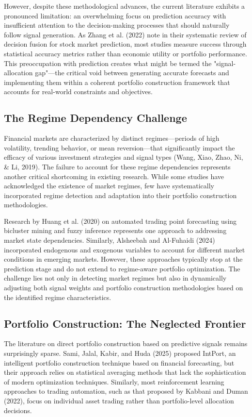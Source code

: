 \documentclass{singlecol-new}
\theoremstyle{TH}{
\newtheorem{lemma}{Lemma}
\newtheorem{theorem}[lemma]{Theorem}
\newtheorem{corrolary}[lemma]{Corrolary}
\newtheorem{conjecture}[lemma]{Conjecture}
\newtheorem{proposition}[lemma]{Proposition}
\newtheorem{claim}[lemma]{Claim}
\newtheorem{stheorem}[lemma]{Wrong Theorem}
\newtheorem{algorithm}{Algorithm}
}
\theoremstyle{THrm}{
\newtheorem{definition}{Definition}[section]
\newtheorem{question}{Question}[section]
\newtheorem{remark}{Remark}
\newtheorem{scheme}{Scheme}
}
\theoremstyle{THhit}{
\newtheorem{case}{Case}[section]
}
\begin{document}
However, despite these methodological advances, the current literature exhibits a pronounced limitation: an overwhelming focus on prediction accuracy with insufficient attention to the decision-making processes that should naturally follow signal generation. As Zhang et al. (2022) note in their systematic review of decision fusion for stock market prediction, most studies measure success through statistical accuracy metrics rather than economic utility or portfolio performance. This preoccupation with prediction creates what might be termed the "signal-allocation gap"—the critical void between generating accurate forecasts and implementing them within a coherent portfolio construction framework that accounts for real-world constraints and objectives.


\subsection{The Regime Dependency Challenge}
Financial markets are characterized by distinct regimes—periods of high volatility, trending behavior, or mean reversion—that significantly impact the efficacy of various investment strategies and signal types (Wang, Xiao, Zhao, Ni, \& Li, 2019). The failure to account for these regime dependencies represents another critical shortcoming in existing research. While some studies have acknowledged the existence of market regimes, few have systematically incorporated regime detection and adaptation into their portfolio construction methodologies.

Research by Huang et al. (2020) on automated trading point forecasting using bicluster mining and fuzzy inference represents one approach to addressing market state dependencies. Similarly, Alsheebah and Al-Fuhaidi (2024) incorporated endogenous and exogenous variables to account for different market conditions in emerging markets. However, these approaches typically stop at the prediction stage and do not extend to regime-aware portfolio optimization. The challenge lies not only in detecting market regimes but also in dynamically adjusting both signal weights and portfolio construction methodologies based on the identified regime characteristics.



\subsection{Portfolio Construction: The Neglected Frontier}
The literature on direct portfolio construction based on predictive signals remains surprisingly sparse. Sami, Jalal, Kabir, and Huda (2025) proposed IntPort, an intelligent portfolio construction technique based on financial forecasting, but their approach relies on statistical averaging methods that lack the sophistication of modern optimization techniques. Similarly, most reinforcement learning approaches to trading automation, such as that proposed by Kabbani and Duman (2022), focus on individual asset trading rather than portfolio-level allocation decisions.
\end{document}
